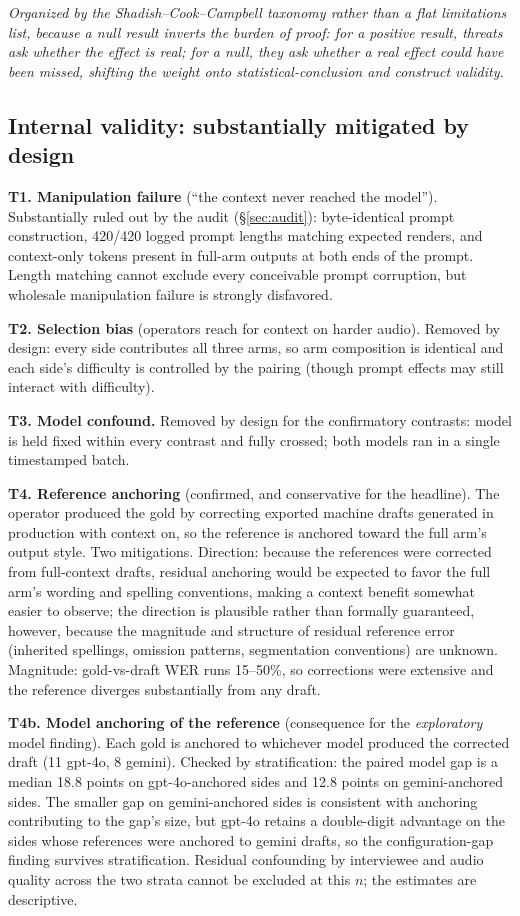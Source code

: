 \documentclass[11pt]{article}
\begin{document}
\emph{Organized by the Shadish--Cook--Campbell taxonomy \citep{shadish02} rather than a flat limitations list, because a null result inverts the burden of proof: for a positive result, threats ask whether the effect is real; for a null, they ask whether a real effect could have been missed, shifting the weight onto statistical-conclusion and construct validity.}

\subsection{Internal validity: substantially mitigated by design}

\textbf{T1. Manipulation failure} (``the context never reached the model''). Substantially ruled out by the audit (\S\ref{sec:audit}): byte-identical prompt construction, 420/420 logged prompt lengths matching expected renders, and context-only tokens present in full-arm outputs at both ends of the prompt. Length matching cannot exclude every conceivable prompt corruption, but wholesale manipulation failure is strongly disfavored.

\textbf{T2. Selection bias} (operators reach for context on harder audio). Removed by design: every side contributes all three arms, so arm composition is identical and each side's difficulty is controlled by the pairing (though prompt effects may still interact with difficulty).

\textbf{T3. Model confound.} Removed by design for the confirmatory contrasts: model is held fixed within every contrast and fully crossed; both models ran in a single timestamped batch.

\textbf{T4. Reference anchoring} (confirmed, and conservative for the headline). The operator produced the gold by correcting exported machine drafts generated in production with context on, so the reference is anchored toward the full arm's output style. Two mitigations. Direction: because the references were corrected from full-context drafts, residual anchoring would be expected to favor the full arm's wording and spelling conventions, making a context benefit somewhat easier to observe; the direction is plausible rather than formally guaranteed, however, because the magnitude and structure of residual reference error (inherited spellings, omission patterns, segmentation conventions) are unknown. Magnitude: gold-vs-draft WER runs 15--50\%, so corrections were extensive and the reference diverges substantially from any draft.

\textbf{T4b. Model anchoring of the reference} (consequence for the \emph{exploratory} model finding). Each gold is anchored to whichever model produced the corrected draft (11 gpt-4o, 8 gemini). Checked by stratification: the paired model gap is a median 18.8 points on gpt-4o-anchored sides and 12.8 points on gemini-anchored sides. The smaller gap on gemini-anchored sides is consistent with anchoring contributing to the gap's size, but gpt-4o retains a double-digit advantage on the sides whose references were anchored to gemini drafts, so the configuration-gap finding survives stratification. Residual confounding by interviewee and audio quality across the two strata cannot be excluded at this $n$; the estimates are descriptive.
\end{document}

